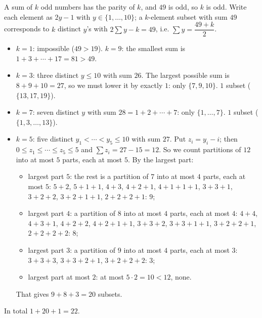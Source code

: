 A sum of $k$ odd numbers has the parity of $k$, and $49$ is odd, so $k$ is odd. Write each element as $2y-1$ with $y\in\{1,\dots,10\}$; a $k$-element subset with sum $49$ corresponds to $k$ distinct $y$'s with $2\sum y-k=49$, i.e. $\sum y=\dfrac{49+k}{2}$.
\begin{itemize}
\item $k=1$: impossible ($49>19$). $k=9$: the smallest sum is $1+3+\cdots+17=81>49$.
\item $k=3$: three distinct $y\le10$ with sum $26$. The largest possible sum is $8+9+10=27$, so we must lower it by exactly $1$: only $\{7,9,10\}$. \quad $1$ subset ($\{13,17,19\}$).
\item $k=7$: seven distinct $y$ with sum $28=1+2+\cdots+7$: only $\{1,\dots,7\}$. \quad $1$ subset ($\{1,3,\dots,13\}$).
\item $k=5$: five distinct $y_1<\cdots<y_5\le10$ with sum $27$. Put $z_i=y_i-i$; then $0\le z_1\le\cdots\le z_5\le5$ and $\sum z_i=27-15=12$. So we count partitions of $12$ into at most $5$ parts, each at most $5$. By the largest part:
\begin{itemize}
\item largest part $5$: the rest is a partition of $7$ into at most $4$ parts, each at most $5$: $5+2$, $5+1+1$, $4+3$, $4+2+1$, $4+1+1+1$, $3+3+1$, $3+2+2$, $3+2+1+1$, $2+2+2+1$: $9$;
\item largest part $4$: a partition of $8$ into at most $4$ parts, each at most $4$: $4+4$, $4+3+1$, $4+2+2$, $4+2+1+1$, $3+3+2$, $3+3+1+1$, $3+2+2+1$, $2+2+2+2$: $8$;
\item largest part $3$: a partition of $9$ into at most $4$ parts, each at most $3$: $3+3+3$, $3+3+2+1$, $3+2+2+2$: $3$;
\item largest part at most $2$: at most $5\cdot2=10<12$, none.
\end{itemize}
That gives $9+8+3=20$ subsets.
\end{itemize}
In total $1+20+1=\boxed{22}$.
